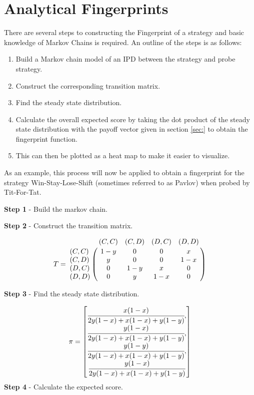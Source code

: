 \section{Analytical Fingerprints}\label{sec:analytical-fingerprints}
There are several steps to constructing the Fingerprint of a strategy and basic knowledge of Markov Chains is required.
An outline of the steps is as follows:

\begin{enumerate}
    \item Build a Markov chain model of an IPD between the strategy and probe strategy.
    \item Construct the corresponding transition matrix.
    \item Find the steady state distribution.
    \item Calculate the overall expected score by taking the dot product of the steady state distribution with the payoff vector given in section \ref{sec:} to obtain the fingerprint function.
    \item This can then be plotted as a heat map to make it easier to visualize.
\end{enumerate}

As an example, this process will now be applied to obtain a fingerprint for the strategy Win-Stay-Lose-Shift (sometimes referred to as Pavlov) when probed by Tit-For-Tat.

\textbf{Step 1} - Build the markov chain.

\textbf{Step 2} - Construct the transition matrix.

\begin{equation}\label{eq:transition_matrix}
%
T = \bordermatrix{~      & (C, C) & (C, D) & (D, C) & (D, D) \cr
                  (C, C) & 1 - y  & 0      & 0      & x      \cr
                  (C, D) & y      & 0      & 0      & 1 - x  \cr
                  (D, C) & 0      & 1 - y  & x      & 0      \cr
                  (D, D) & 0      & y      & 1 - x  & 0}
%
\end{equation}

\textbf{Step 3} - Find the steady state distribution.

\begin{equation}\label{eq:steady_state}
%
\pi =
\begin{bmatrix}
\cfrac{x (1 - x)}{2y(1-x) + x(1-x) + y(1-y)}, \\
\cfrac{y (1 - x)}{2y(1-x) + x(1-x) + y(1-y)}, \\
\cfrac{y (1 - y)}{2y(1-x) + x(1-x) + y(1-y)}, \\
\cfrac{y (1 - x)}{2y(1-x) + x(1-x) + y(1-y)}
\end{bmatrix}
\end{equation}
\textbf{Step 4} - Calculate the expected score.

